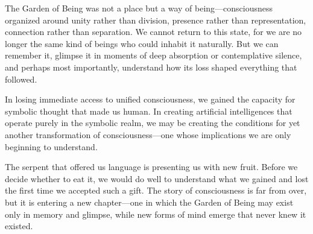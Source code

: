 The Garden of Being was not a place but a way of being—consciousness organized around unity rather than division, presence rather than representation, connection rather than separation. We cannot return to this state, for we are no longer the same kind of beings who could inhabit it naturally. But we can remember it, glimpse it in moments of deep absorption or contemplative silence, and perhaps most importantly, understand how its loss shaped everything that followed.

In losing immediate access to unified consciousness, we gained the capacity for symbolic thought that made us human. In creating artificial intelligences that operate purely in the symbolic realm, we may be creating the conditions for yet another transformation of consciousness—one whose implications we are only beginning to understand.

The serpent that offered us language is presenting us with new fruit. Before we decide whether to eat it, we would do well to understand what we gained and lost the first time we accepted such a gift. The story of consciousness is far from over, but it is entering a new chapter—one in which the Garden of Being may exist only in memory and glimpse, while new forms of mind emerge that never knew it existed.
